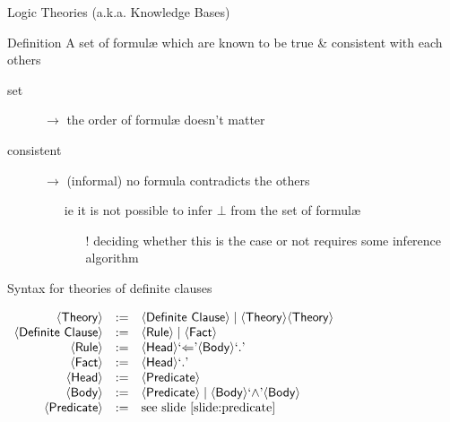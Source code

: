 \documentclass[presentation]{beamer}\mode<presentation>{\usetheme{AMSBolognaFC}}
\begin{document}
\begin{frame}[allowframebreaks]{Logic Theories (a.k.a. Knowledge Bases)}
    \begin{block}{Definition}
        A \alert{set} of formul\ae{} which are known to be true \& \alert{consistent} with each others
        \begin{description}
            \item[set] $\rightarrow$ the order of formul\ae{} doesn't matter
            \item[consistent] $\rightarrow$ (informal) no formula contradicts the others
            \begin{itemize}
                \item[ie] it is not possible to infer $\bot$ from the set of formul\ae{}
                \begin{itemize}
                    \item[!] deciding whether this is the case or not requires some \alert{inference} algorithm
                \end{itemize}
            \end{itemize}
        \end{description}
    \end{block}
    \begin{block}{Syntax for theories of definite clauses}
        \begin{center}
            $\begin{array}{rcl}
                \mathsf{\left\langle Theory\right\rangle} & := & \mathsf{\left\langle Definite~Clause\right\rangle} \mid \mathsf{\left\langle Theory\right\rangle} \mathsf{\left\langle Theory\right\rangle}
                \\
                \mathsf{\left\langle Definite~Clause\right\rangle} & := & \mathsf{\left\langle Rule\right\rangle} \mid \mathsf{\left\langle Fact\right\rangle}
                \\
                \mathsf{\left\langle Rule\right\rangle} & := & \mathsf{\left\langle Head\right\rangle} \text{`}\mathit{\Leftarrow}\text{'} \mathsf{\left\langle Body\right\rangle} \text{`}\mathit{\mathtt{.}}\text{'}
                \\
                \mathsf{\left\langle Fact\right\rangle} & := & \mathsf{\left\langle Head\right\rangle} \text{`}\mathit{\mathtt{.}}\text{'}
                \\
                \mathsf{\left\langle Head\right\rangle} & := & \mathsf{\left\langle Predicate\right\rangle}
                \\
                \mathsf{\left\langle Body\right\rangle} & := & \mathsf{\left\langle Predicate\right\rangle} \mid \mathsf{\left\langle Body\right\rangle} \text{`}\mathit{\wedge}\text{'} \mathsf{\left\langle Body\right\rangle}
                \\
                \mathsf{\left\langle Predicate\right\rangle} & := & \text{see slide \ref{slide:predicate}}
            \end{array}$
        \end{center}
    \end{block}
\end{frame}
\end{document}
